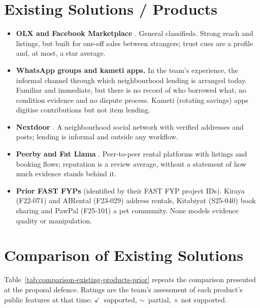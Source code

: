 \section{Existing Solutions / Products}\label{sec:existing-solutions-products}
\begin{itemize}
\item \textbf{OLX and Facebook Marketplace} \cite{olx,fbmarketplace}. General classifieds. Strong reach and listings, but built for one-off sales between strangers; trust cues are a profile and, at most, a star average.
\item \textbf{WhatsApp groups and kameti apps.} In the team's experience, the informal channel through which neighbourhood lending is arranged today. Familiar and immediate, but there is no record of who borrowed what, no condition evidence and no dispute process. Kameti (rotating savings) apps digitise contributions \cite{mehmood2019} but not item lending.
\item \textbf{Nextdoor} \cite{nextdoor}. A neighbourhood social network with verified addresses and posts; lending is informal and outside any workflow.
\item \textbf{Peerby and Fat Llama} \cite{peerby,fatllama}. Peer-to-peer rental platforms with listings and booking flows; reputation is a review average, without a statement of how much evidence stands behind it.
\item \textbf{Prior FAST FYPs} (identified by their FAST FYP project IDs). Kiraya (F22-071) and AIRental (F23-029) address rentals, Kitabiyat (S25-040) book sharing and PawPal (F25-101) a pet community. None models evidence quality or manipulation.
\end{itemize}

\section{Comparison of Existing Solutions}\label{sec:comparison-existing-solutions}
Table~\ref{tab:comparison-existing-products-prior} repeats the comparison presented at the proposal defence. Ratings are the team's assessment of each product's public features at that time: $\checkmark$~supported, $\sim$~partial, $\times$ not supported.


